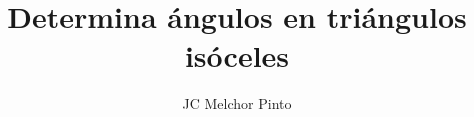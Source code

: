 \documentclass[12pt,addpoints,answers]{guia}
\title{Determina ángulos en triángulos isóceles}
\author{JC Melchor Pinto}
\begin{document}
\INFO%
\begin{multicols}{2}
    
    
    \columnbreak
    
\end{multicols}

\ejemplosboxed[]
\begin{questions}
    \questionboxed[10]{}
    \ejemplosboxed[]
    \questionboxed[15]{}
    \questionboxed[15]{}
    \ejemplosboxed[]
    \questionboxed[15]{}
    \questionboxed[15]{}
    \ejemplosboxed[]
    \questionboxed[15]{}
    \questionboxed[15]{}
\end{questions}
\end{document}

